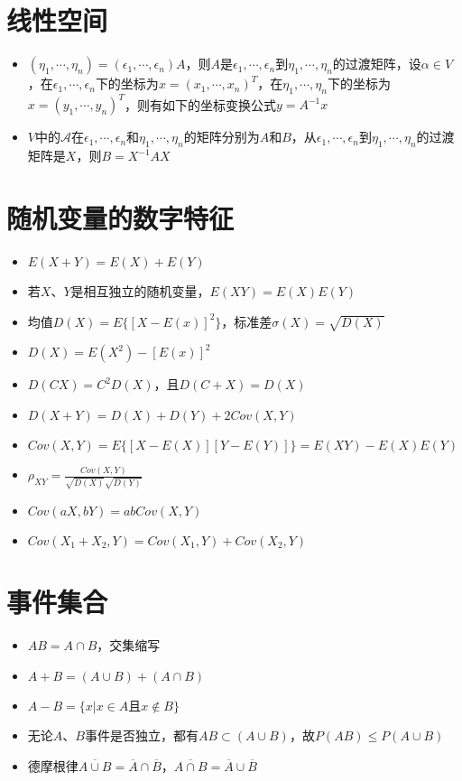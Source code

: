 \documentclass[UTF8]{ctexart}
\begin{document}
\section{线性空间}
\begin{itemize}

\item $(\eta_1,\cdots,\eta_n)=(\epsilon_1,\cdots,\epsilon_n)A$，则$A$是$\epsilon_1,\cdots,\epsilon_n$到$\eta_1,\cdots,\eta_n$的过渡矩阵，设$\alpha\in V$，在$\epsilon_1,\cdots,\epsilon_n$下的坐标为$x=(x_1,\cdots,x_n)^T$，在$\eta_1,\cdots,\eta_n$下的坐标为$x=(y_1,\cdots,y_n)^T$，则有如下的坐标变换公式$y=A^{-1}x$
\item $V$中的$\mathcal{A}$在$\epsilon_1,\cdots,\epsilon_n$和$\eta_1,\cdots,\eta_n$的矩阵分别为$A$和$B$，从$\epsilon_1,\cdots,\epsilon_n$到$\eta_1,\cdots,\eta_n$的过渡矩阵是$X$，则$B=X^{-1}AX$
\end{itemize}


\section{随机变量的数字特征}
\begin{itemize}
	\item $E(X+Y) = E(X) + E(Y)$
	\item 若$X$、$Y$是相互独立的随机变量，$E(XY) = E(X)E(Y)$
	\item 均值$D(X) = E\{ [X- E(x)]^2 \}$，标准差$\sigma(X) = \sqrt{D(X)}$
	\item $D(X) = E(X^2)- [E(x)]^2 $
	\item $D(CX) = C^2D(X)$，且$D(C+X) = D(X)$
	\item $D(X+Y) = D(X) + D(Y) +2Cov(X,Y)$
	\item $Cov(X,Y) = E\{[X-E(X)][Y-E(Y)]\} = E(XY) - E(X)E(Y)$
	\item $\rho_{XY} = \frac{Cov(X,Y)}{\sqrt{D(X)}\sqrt{D(Y)}}$
	\item $Cov(aX,bY) = abCov(X,Y)$
	\item $Cov(X_1+X_2,Y) = Cov(X_1,Y)+Cov(X_2,Y)$

\end{itemize}




\section{事件集合}
\begin{itemize}
	\item $AB=A\cap B$，交集缩写

	\item $A+B=(A\cup B)+(A\cap B)$

	\item $A-B = \{x|x\in A$且$x \notin B\}$

	\item 无论$A$、$B$事件是否独立，都有$AB \subset (A\cup B)$，故$P(AB)\leq P(A\cup B)$

	\item 德摩根律$\overline{A\cup B}=\overline{A} \cap \overline{B}$，$\overline{A\cap B}=\overline{A} \cup \overline{B}$


\end{itemize}
\end{document}
